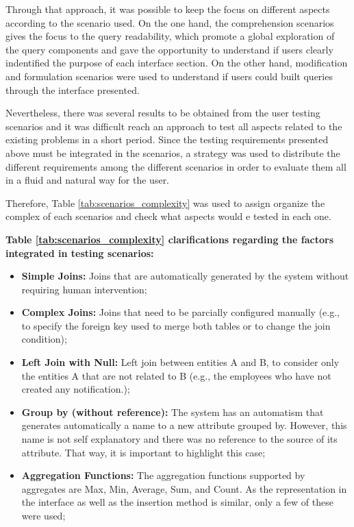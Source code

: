 Through that approach, it was possible to keep the focus on different aspects according to the scenario used. On the one hand, the comprehension scenarios gives the focus to the query readability, which promote a global exploration of the query components and gave the opportunity to understand if users clearly indentified the purpose of each interface section. On the other hand, modification and formulation scenarios were used to understand if users could built queries through the interface presented.

Nevertheless, there was several results to be obtained from the user testing scenarios and it was difficult reach an approach to test all aspects related to the existing problems in a short period. Since the testing requirements presented above must be integrated in the scenarios, a strategy was used to distribute the different requirements among the different scenarios in order to evaluate them all in a fluid and natural way for the user. 


Therefore, Table \ref{tab:scenarios_complexity} was used to assign organize the complex of each scenarios and check what aspects would e tested in each one.

\textbf{Table \ref{tab:scenarios_complexity} clarifications regarding the factors integrated in testing scenarios: }
\begin{itemize}
    \item \textbf{Simple Joins: }Joins that are automatically generated by the system without requiring human intervention;
    \item \textbf{Complex Joins: }Joins that need to be parcially configured manually (e.g., to specify the foreign key used to merge both tables or to change the join condition);
    \item \textbf{Left Join with Null: }Left join between entities A and B, to consider only the entities A that are not related to B (e.g., the employees who have not created any notification.);
    \item \textbf{Group by (without reference): } The system has an automatism that generates automatically a name to a new attribute grouped by. However, this name is not self explanatory and there was no reference to the source of its attribute. That way, it is important to highlight this case;
    \item \textbf{Aggregation Functions: } The aggregation functions supported by aggregates are Max, Min, Average, Sum, and Count. As the representation in the interface as well as the insertion method is similar, only a few of these were used;
\end{itemize}

